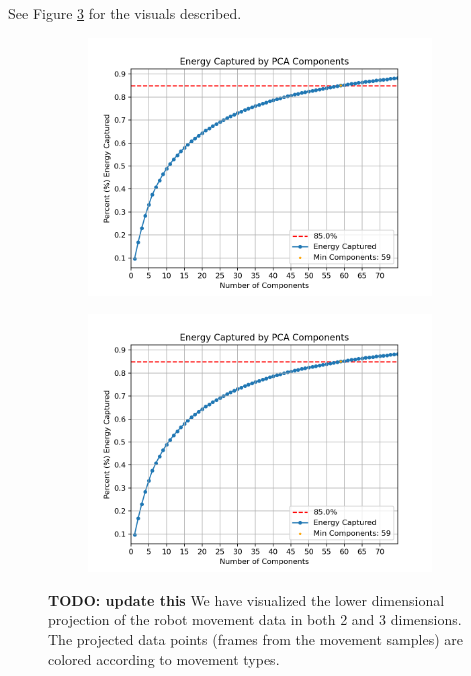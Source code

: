 \documentclass[11pt]{amsart}
\begin{document}
See Figure \ref{fig:f1} for the visuals described.

\begin{figure}[h]
    \centering
    \begin{subfigure}{0.4\textwidth}
        \centering
        \includegraphics[width=\textwidth]{../visualizations/energy_by_components.png}
        \label{fig:image1}
    \end{subfigure}
    \begin{subfigure}{0.4\textwidth}
        \centering
        \includegraphics[width=\textwidth]{../visualizations/energy_by_components.png}
        \label{fig:image2}
    \end{subfigure}
    \caption{ \textbf{TODO: update this} We have visualized the lower dimensional projection of the robot movement data in both 2 and 3 dimensions.
    The projected data points (frames from the movement samples) are colored according to movement types.}
    \label{fig:f1}
\end{figure}
\end{document}
